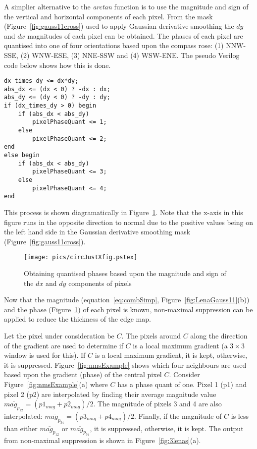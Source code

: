\documentclass[10pt,twocolumn,letterpaper]{article}
\begin{document}
A simplier alternative to the \emph{arctan} function is to use the magnitude and
sign of the vertical and horizontal components of each pixel. 
From the mask (Figure~\ref{fig:gauss11cross}) used to apply Gaussian derivative smoothing
the $dy$ and $dx$ magnitudes of each pixel can be obtained. 
The phases of each pixel are quantised into one of four orientations based upon the compass rose: 
(1) NNW-SSE, (2) WNW-ESE, (3)
NNE-SSW and (4) WSW-ENE.
The pseudo Verilog code below shows how this is done.

\scriptsize
\begin{verbatim}
dx_times_dy <= dx*dy;
abs_dx <= (dx < 0) ? -dx : dx;
abs_dy <= (dy < 0) ? -dy : dy;
if (dx_times_dy > 0) begin
    if (abs_dx < abs_dy)
        pixelPhaseQuant <= 1;
    else
        pixelPhaseQuant <= 2;
end
else begin
    if (abs_dx < abs_dy) 
        pixelPhaseQuant <= 3;
    else
        pixelPhaseQuant <= 4;
end
\end{verbatim}
\normalsize
This process is shown diagramatically in Figure~\ref{fig:circle5}.
Note that the x-axis in this figure runs in the opposite direction to normal due to the positive
values being on the left hand side in the Gaussian derivative smoothing mask (Figure~\ref{fig:gauss11cross}).
\begin{figure}[!htb]
\begin{center}
\setlength{\abovecaptionskip}{-0.25cm}
        \texttt{[image: pics/circJustXfig.pstex]}
        \caption{Obtaining quantised phases based upon the magnitude and sign of the $dx$ and $dy$ components of pixels}
        \label{fig:circle5}
\setlength{\abovecaptionskip}{0cm}
\end{center}
\end{figure}
Now that the magnitude (equation~\ref{eq:combSimp}, Figure~\ref{fig:LenaGauss11}(b)) and the phase (Figure~\ref{fig:circle5}) of
each pixel is known, non-maximal suppression can be applied to reduce the thickness of the edge map.

Let the pixel under consideration be $C$. The pixels around $C$ along the direction of the gradient
are used to determine if $C$ is a local maximum gradient (a $3 \times 3$ window is used for this).
If $C$ is a local maximum gradient, it is kept, otherwise, it is suppressed. 
Figure~\ref{fig:nmsExample} shows which four neighbours are used based upon the gradient (phase) of the
central pixel $C$. Consider Figure~\ref{fig:nmsExample}(a) where $C$ has a phase quant of one.
Pixel 1 (p1) and pixel 2 (p2) are interpolated by finding their average magnitude value
$\overline{mag_{p_{12}}}=(p1_{mag}+p2_{mag})/2$. 
The magnitude of pixels 3 and 4 are also interpolated:
$\overline{mag_{p_{34}}}=(p3_{mag}+p4_{mag})/2$. 
Finally, if the magnitude of $C$ is less than either $\overline{mag_{p_{12}}}$ or $\overline{mag_{p_{34}}}$, it
is suppressed, otherwise, it is kept. The output from non-maximal suppression is shown in Figure~\ref{fig:3lenas}(a).
\end{document}
